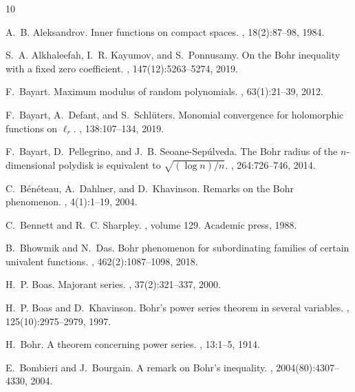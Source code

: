 \documentclass[12pt]{amsart}
\numberwithin{subsection}{section}
\theoremstyle{definition}
\theoremstyle{remark}
\begin{document}
\begin{thebibliography}{10}

A.~B. Aleksandrov.
\newblock Inner functions on compact spaces.
, 18(2):87--98, 1984.

S.~A. Alkhaleefah, I.~R. Kayumov, and S.~Ponnusamy.
\newblock On the {Bohr} inequality with a fixed zero coefficient.
, 147(12):5263--5274, 2019.

F.~Bayart.
\newblock Maximum modulus of random polynomials.
, 63(1):21--39, 2012.

F.~Bayart, A.~Defant, and S.~Schl{\"u}ters.
\newblock Monomial convergence for holomorphic functions on $\ell_r$.
, 138:107--134, 2019.

F.~Bayart, D.~Pellegrino, and J.~B. Seoane-Sep{\'u}lveda.
\newblock The {Bohr} radius of the {{\(n\)}}-dimensional polydisk is equivalent to {{\(\sqrt{(\log n) / n}\)}}.
, 264:726--746, 2014.

C.~B{\'e}n{\'e}teau, A.~Dahlner, and D.~Khavinson.
\newblock Remarks on the {Bohr} phenomenon.
, 4(1):1--19, 2004.

C.~Bennett and R.~C. Sharpley.
, volume 129.
\newblock Academic press, 1988.

B.~Bhowmik and N.~Das.
\newblock Bohr phenomenon for subordinating families of certain univalent functions.
, 462(2):1087--1098, 2018.

H.~P. Boas.
\newblock Majorant series.
, 37(2):321--337, 2000.

H.~P. Boas and D.~Khavinson.
\newblock Bohr's power series theorem in several variables.
, 125(10):2975--2979, 1997.

H.~Bohr.
\newblock A theorem concerning power series.
, 13:1--5, 1914.

E.~Bombieri and J.~Bourgain.
\newblock A remark on {Bohr}'s inequality.
, 2004(80):4307--4330, 2004.


\end{thebibliography}
\end{document}
